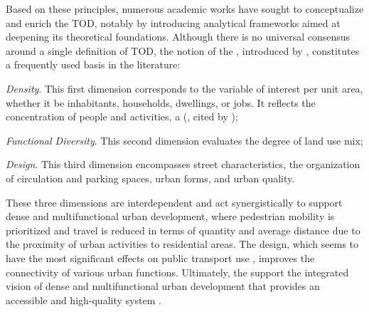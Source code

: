 \begin{refsegment}
Based on these principles, numerous academic works have sought to conceptualize and enrich the \acrshort{TOD}, notably by introducing analytical frameworks aimed at deepening its theoretical foundations. Although there is no universal consensus around a single definition of \acrshort{TOD}, the notion of the , introduced by \textcolor{blue}{\textcite[216]{cervero_travel_1997}}, constitutes a frequently used basis in the literature:
    \begin{customitemize}
\item \textsl{Density}. This first dimension corresponds to the variable of interest per unit area, whether it be inhabitants, households, dwellings, or jobs. It reflects the concentration of people and activities, a  (\textcolor{blue}{\textcite{cervero_panorama_2012}}, cited by \textcolor{blue}{\textcite[127]{lo_feudo_scenario_2014}});
\item \textsl{Functional Diversity}. This second dimension evaluates the degree of land use mix;
\item \textsl{Design}. This third dimension encompasses street characteristics, the organization of circulation and parking spaces, urban forms, and urban quality.
    \end{customitemize}%

These three dimensions are interdependent and act synergistically to support dense and multifunctional urban development, where pedestrian mobility is prioritized and travel is reduced in terms of quantity and average distance due to the proximity of urban activities to residential areas. The \gls{design}, which seems to have the most significant effects on public transport use \textcolor{blue}{\autocite[107]{ewing_travel_2001}}, improves the connectivity of various urban functions. Ultimately, the  support the integrated vision of dense and multifunctional urban development that provides an accessible and high-quality system \textcolor{blue}{\autocites[216]{cervero_travel_1997}[107]{ewing_travel_2001}}.%


\end{refsegment}
